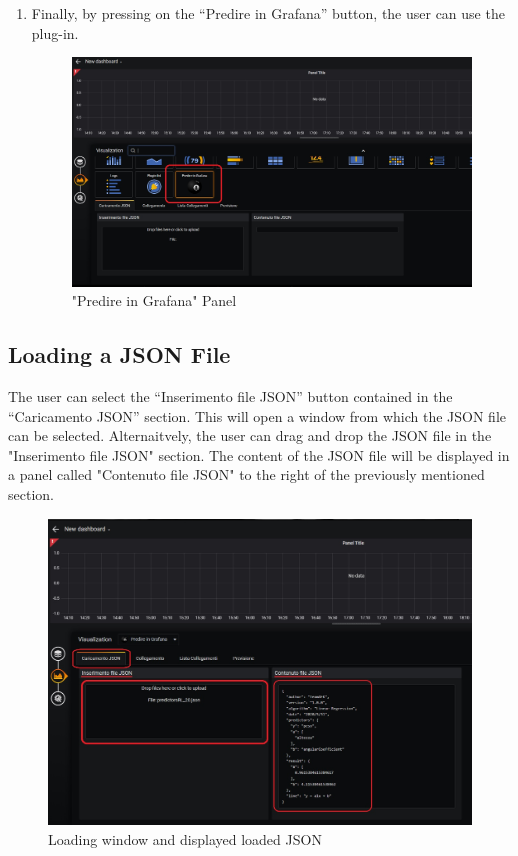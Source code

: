\begin{enumerate}
	\item Finally, by pressing on the “Predire in Grafana” button, the user can use the plug-in.
	
\begin{figure}[H]
\centering
\includegraphics[scale=0.55]{img/plug-in/selection_ball.jpg}
\caption{"Predire in Grafana" Panel}
\end{figure}

\end{enumerate}

	
\subsection{Loading a JSON File}
The user can select the “Inserimento file JSON” button contained in the “Caricamento JSON” section.
This will open a window from which the JSON file can be selected.
Alternaitvely, the user can drag and drop the JSON file in the "Inserimento file JSON" section.
The content of the JSON file will be displayed in a panel called "Contenuto file JSON" to the right of the previously mentioned section.

\begin{figure}[H]
\centering
\includegraphics[scale=0.65]{img/plug-in/loading_js.jpg}
\caption{Loading window and displayed loaded JSON}
\end{figure}


